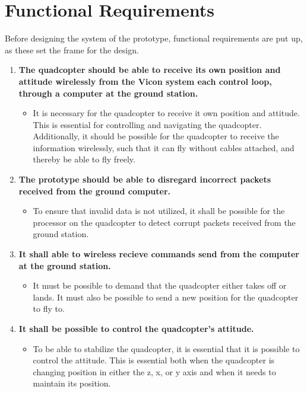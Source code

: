 \chapter{Functional Requirements}
\label{ch:functionalRequirements}
Before designing the system of the prototype, functional requirements are put up, as these set the frame for the design.  

\begin{enumerate}[label=\textbf{\arabic*})]


\item \textbf{The quadcopter should be able to receive its own position and attitude wirelessly from the Vicon system each control loop, through a computer at the ground station.}
\begin{itemize}
\item[] It is necessary for the quadcopter to receive it own position and attitude. This is essential for controlling and navigating the quadcopter. Additionally, it should be possible for the quadcopter to receive the information wirelessly, such that it can fly without cables attached, and thereby be able to fly freely.
\end{itemize}


\item \textbf{The prototype should be able to disregard incorrect packets received from the ground computer.}
\begin{itemize}
\item[] To ensure that invalid data is not utilized, it shall be possible for the processor on the quadcopter to detect corrupt packets received from the ground station.
\end{itemize}


\item \textbf{It shall able to wireless recieve commands send from the  computer at the ground station.}
\begin{itemize}
\item[] It must be possible to demand that the quadcopter either takes off or lands. It must also be possible to send a new position for the quadcopter to fly to.  
\end{itemize}


\item \textbf{It shall be possible to control the quadcopter's attitude.}
\begin{itemize}
\item[] To be able to stabilize the quadcopter, it is essential that it is possible to control the attitude. This is essential both when the quadcopter is changing position in either the z, x, or y axis and when it needs to maintain its position.
\end{itemize}



\end{enumerate}
